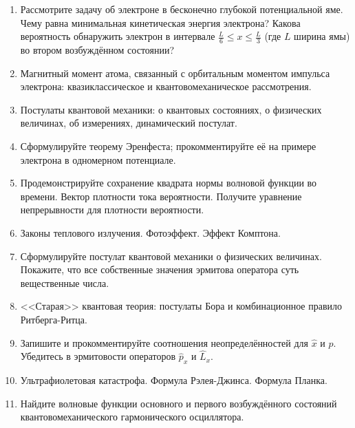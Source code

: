 \documentclass[12pt]{article}
\newcommand{\kL}[1]{\label{К-#1}}
\def\twodigits#1{%
\ifnum#1<10 0\fi 
\number#1}
\begin{document}
\begin{enumerate}[label={\textbf{К-\protect\twodigits{\theenumi}}}]
\item\kL{23}
Рассмотрите задачу об электроне в бесконечно глубокой потенциальной яме. Чему равна минимальная кинетическая энергия электрона? Какова вероятность обнаружить электрон в интервале $\frac{L}{6}\le x\le\frac{L}{3}$ (где $L$ ширина ямы) во втором возбуждённом состоянии?

\item\kL{24}
Магнитный момент атома, связанный с орбитальным моментом импульса электрона: квазиклассическое и квантовомеханическое рассмотрения.

\item\kL{25}
Постулаты квантовой механики: о квантовых состояниях, о физических величинах, об измерениях, динамический постулат.

\item\kL{26}
Сформулируйте теорему Эренфеста; прокомментируйте её на примере электрона в одномерном потенциале.

\item\kL{27}
Продемонстрируйте сохранение квадрата нормы волновой функции во времени. Вектор плотности тока вероятности. Получите уравнение непрерывности для плотности вероятности.

\item\kL{28}
Законы теплового излучения. Фотоэффект. Эффект Комптона.

\item\kL{29}
Сформулируйте постулат квантовой механики о физических величинах. Покажите, что все собственные значения эрмитова оператора суть вещественные числа.

\item\kL{30}
<<Старая>> квантовая теория: постулаты Бора и комбинационное правило Ритберга-Ритца.

\item\kL{31}
Запишите и прокомментируйте соотношения неопределённостей для $\hat{x}$ и $\hat{p}$. Убедитесь в эрмитовости операторов $\hat{p}_x$ и $\hat{L}_x$.

\item\kL{32}
Ультрафиолетовая катастрофа. Формула Рэлея-Джинса. Формула Планка.

\item\kL{33}
Найдите волновые функции основного и первого возбуждённого состояний квантовомеханического гармонического осциллятора.


\end{enumerate}
\end{document}

